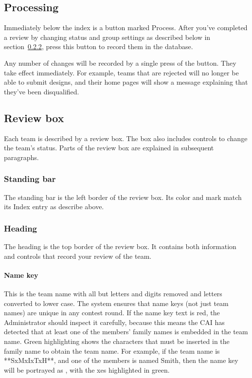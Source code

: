 \documentclass[11pt,letterpaper]{refart}
\def\ui#1{\textsf{#1}}
\begin{document}
\subsection{Processing}
Immediately below the index is a button marked \ui{Process}. After you've 
completed a review by changing status and group settings as described below
in section~\ref{sec:heading}, press this button to record them in the database. 

Any number of changes will be recorded by a single press of the button.
They take effect immediately. For example, teams that are rejected will no longer be 
able to submit designs, and their home pages will show a message explaining that 
they've been disqualified.

\subsection{Review box}
Each team is described by a review box. The box also includes controls to change
the team's status. Parts of the review box are explained in subsequent paragraphs.

\subsubsection{Standing bar}
The standing bar is the left border of the review box. Its color and mark match
its Index entry as describe above. 

\subsubsection{Heading}
\label{sec:heading}
The heading is the top border of the review box. It contains both information
and controls that record your review of the team. 

\paragraph{Name key}
This is the team name
with all but letters and digits removed and letters converted to lower case. The
system ensures that name keys (not just team names) are unique in any contest 
round. If the name key text is red, the Administrator
should inspect it carefully, because this means the CAI has detected that at
least one of the members' family names is embedded in the team name. Green
highlighting shows the characters that must be inserted in the family name to
obtain the team name. For example, if the team name is \ui{**SxMxIxTxH**}, and
one of the members is named Smith, then the name key will be portrayed as
\ui{\color{red}{sxmxixtxh}}, with the \ui{x}es highlighted in green.
\end{document}
